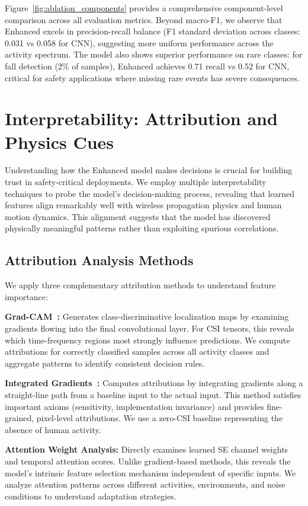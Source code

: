 \documentclass[journal]{IEEEtran}
\begin{document}
Figure~\ref{fig:ablation_components} provides a comprehensive component-level comparison across all evaluation metrics. Beyond macro-F1, we observe that Enhanced excels in precision-recall balance (F1 standard deviation across classes: 0.031 vs 0.058 for CNN), suggesting more uniform performance across the activity spectrum. The model also shows superior performance on rare classes: for fall detection (2\% of samples), Enhanced achieves 0.71 recall vs 0.52 for CNN, critical for safety applications where missing rare events has severe consequences.

\section{Interpretability: Attribution and Physics Cues}
Understanding how the Enhanced model makes decisions is crucial for building trust in safety-critical deployments. We employ multiple interpretability techniques to probe the model's decision-making process, revealing that learned features align remarkably well with wireless propagation physics and human motion dynamics. This alignment suggests that the model has discovered physically meaningful patterns rather than exploiting spurious correlations.

\subsection{Attribution Analysis Methods}
We apply three complementary attribution methods to understand feature importance:

\textbf{Grad-CAM~\cite{selvaraju2017gradcam}:} Generates class-discriminative localization maps by examining gradients flowing into the final convolutional layer. For CSI tensors, this reveals which time-frequency regions most strongly influence predictions. We compute attributions for correctly classified samples across all activity classes and aggregate patterns to identify consistent decision rules.

\textbf{Integrated Gradients~\cite{sundararajan2017ig}:} Computes attributions by integrating gradients along a straight-line path from a baseline input to the actual input. This method satisfies important axioms (sensitivity, implementation invariance) and provides fine-grained, pixel-level attributions. We use a zero-CSI baseline representing the absence of human activity.

\textbf{Attention Weight Analysis:} Directly examines learned SE channel weights and temporal attention scores. Unlike gradient-based methods, this reveals the model's intrinsic feature selection mechanism independent of specific inputs. We analyze attention patterns across different activities, environments, and noise conditions to understand adaptation strategies.
\end{document}
